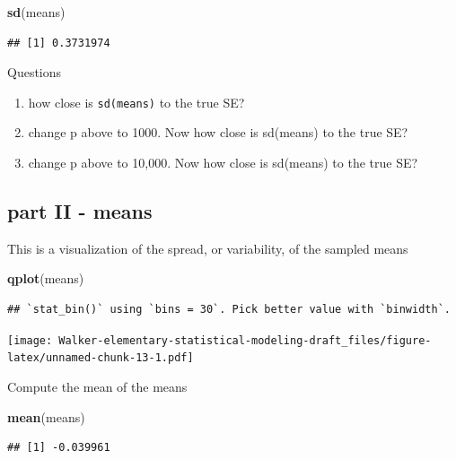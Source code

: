 \documentclass[]{book}
\newenvironment{Shaded}{\begin{snugshade}}{\end{snugshade}}
\newcommand{\KeywordTok}[1]{\textcolor[rgb]{0.13,0.29,0.53}{\textbf{#1}}}
\newcommand{\NormalTok}[1]{#1}
\providecommand{\tightlist}{%
  \setlength{\itemsep}{0pt}\setlength{\parskip}{0pt}}
\begin{document}
\begin{Shaded}
\begin{Highlighting}[]
\KeywordTok{sd}\NormalTok{(means)}
\end{Highlighting}
\end{Shaded}

\begin{verbatim}
## [1] 0.3731974
\end{verbatim}

Questions

\begin{enumerate}
\def\labelenumi{\arabic{enumi}.}
\tightlist
\item
  how close is \texttt{sd(means)} to the true SE?
\item
  change p above to 1000. Now how close is sd(means) to the true SE?
\item
  change p above to 10,000. Now how close is sd(means) to the true SE?
\end{enumerate}

\subsection{part II - means}\label{part-ii---means}

This is a visualization of the spread, or variability, of the sampled
means

\begin{Shaded}
\begin{Highlighting}[]
\KeywordTok{qplot}\NormalTok{(means)}
\end{Highlighting}
\end{Shaded}

\begin{verbatim}
## `stat_bin()` using `bins = 30`. Pick better value with `binwidth`.
\end{verbatim}

\texttt{[image: Walker-elementary-statistical-modeling-draft\_files/figure-latex/unnamed-chunk-13-1.pdf]}

Compute the mean of the means

\begin{Shaded}
\begin{Highlighting}[]
\KeywordTok{mean}\NormalTok{(means)}
\end{Highlighting}
\end{Shaded}

\begin{verbatim}
## [1] -0.039961
\end{verbatim}
\end{document}
